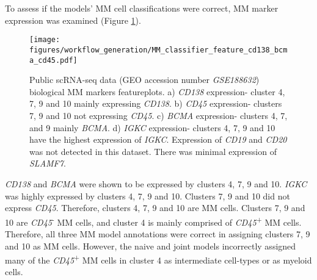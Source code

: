 To assess if the models' MM cell classifications were correct, MM marker expression was examined (Figure \ref{fig:mm_class_ftp_cd138_cd45_bcma}).
\begin{figure}[htb]
\centering
\texttt{[image: figures/workflow\_generation/MM\_classifier\_feature\_cd138\_bcma\_cd45.pdf]}
\caption[Public scRNA-seq data bioligical MM markers featureplots]{Public scRNA-seq data (GEO accession number \textit{GSE188632}) biological MM markers featureplots.
a) \textit{CD138} expression- cluster 4, 7, 9 and 10 mainly expressing \textit{CD138}.
b) \textit{CD45} expression- clusters 7, 9 and 10 not expressing \textit{CD45}.
c) \textit{BCMA} expression- clusters 4, 7, and 9 mainly \textit{BCMA}.
d) \textit{IGKC} expression- clusters 4, 7, 9 and 10 have the highest expression of \textit{IGKC}.
Expression of \textit{CD19} and \textit{CD20} was not detected in this dataset.
There was minimal expression of \textit{SLAMF7}.
}
\label{fig:mm_class_ftp_cd138_cd45_bcma}
\end{figure}
%
\textit{CD138} and \textit{BCMA} were shown to be expressed by clusters 4, 7, 9 and 10.
\textit{IGKC} was highly expressed by clusters 4, 7, 9 and 10.
Clusters 7, 9 and 10 did not express \textit{CD45}.
Therefore, clusters 4, 7, 9 and 10 are MM cells.
Clusters 7, 9 and 10 are \textit{CD45}\textsuperscript{-} MM cells, and cluster 4 is mainly comprised of \textit{CD45}\textsuperscript{+} MM cells.
Therefore, all three MM model annotations were correct in assigning clusters 7, 9 and 10 as MM cells.
However, the naive and joint models incorrectly assigned many of the \textit{CD45}\textsuperscript{+} MM cells in cluster 4 as intermediate cell-types or as myeloid cells.

